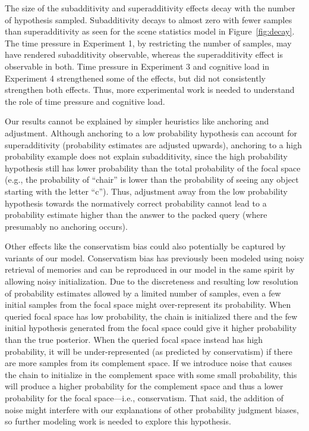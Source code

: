 The size of the subadditivity and superadditivity effects decay with the number of hypothesis sampled. Subadditivity decays to almost zero with fewer samples than superadditivity as seen for the scene statistics model in Figure~\ref{fig:decay}. The time pressure in Experiment 1, by restricting the number of samples, may have rendered subadditivity observable, whereas the superadditivity effect is observable in both. Time pressure in Experiment 3 and cognitive load in Experiment 4 strengthened some of the effects, but did not consistently strengthen both effects. Thus, more experimental work is needed to understand the role of time pressure and cognitive load.

Our results cannot be explained by simpler heuristics like anchoring and adjustment. Although anchoring to a low probability hypothesis can account for superadditivity (probability estimates are adjusted upwards), anchoring to a high probability example does not explain subadditivity, since the high probability hypothesis still has lower probability than the total probability of the focal space (e.g., the probability of ``chair'' is lower than the probability of seeing any object starting with the letter ``c''). Thus, adjustment away from the low probability hypothesis towards the normatively correct probability cannot lead to a probability estimate higher than the answer to the packed query (where presumably no anchoring occurs).

Other effects like the conservatism bias could also potentially be captured by variants of our model. Conservatism bias has previously been modeled using noisy retrieval of memories \citep{Dougherty1999,marchiori15} and can be reproduced in our model in the same spirit by allowing noisy initialization. Due to the discreteness and resulting low resolution of probability estimates allowed by a limited number of samples, even a few initial samples from the focal space might over-represent its probability. When queried focal space has low probability, the chain is initialized there and the few initial hypothesis generated from the focal space could give it higher probability than the true posterior. When the queried focal space instead has high probability, it will be under-represented (as predicted by conservatism) if there are more samples from its complement space. If we introduce noise that causes the chain to initialize in the complement space with some small probability, this will produce a higher probability for the complement space and thus a lower  probability for the focal space---i.e., conservatism. That said, the addition of noise might interfere with our explanations of other probability judgment biases, so further modeling work is needed to explore this hypothesis.

